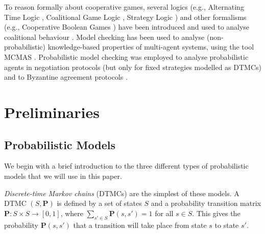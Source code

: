 \documentclass{llncs}
\begin{document}
To reason formally about cooperative games, several logics (e.g., Alternating Time Logic \cite{AlurHK02}, Coalitional Game Logic \cite{agotnes2009reasoning}, Strategy Logic \cite{chatterjee2007strategy}) and other formalisms (e.g., Cooperative Boolean Games \cite{dunne2008cooperative}) have been introduced and used to analyse coalitional behaviour \cite{bonzon2007efficient}.
Model checking has been used to analyse (non-probabilistic) knowledge-based properties of multi-agent systems,
using the tool MCMAS \cite{lomuscio2006mcmas}.
Probabilistic model checking was employed to
analyse probabilistic agents in negotiation protocols \cite{BFW06b}
(but only for fixed strategies modelled as DTMCs)
and to Byzantine agreement protocols \cite{KN02}.
\section{Preliminaries}


\subsection{Probabilistic Models}
We begin with a brief introduction to the three different types of probabilistic models
that we will use in this paper.

\emph{Discrete-time Markov chains} (DTMCs) are the simplest of these models.
A DTMC $(S,\mathbf{P})$ is defined by a set of states $S$ and a probability transition matrix
$\mathbf{P} : S\times S \rightarrow [0, 1]$, where $\sum_{s'\in S} \mathbf{P}(s, s') = 1$ for all $s \in  S$.
This gives the probability $\mathbf{P}(s, s')$ that a transition will take place from state $s$ to state $s'$.
\end{document}
